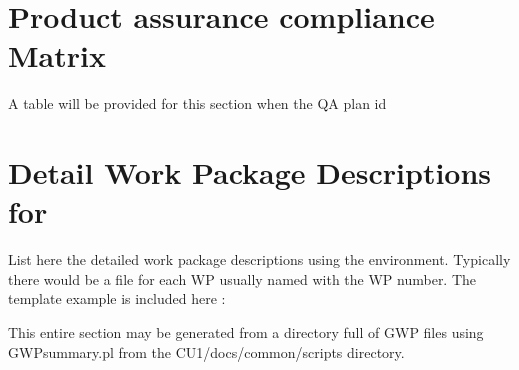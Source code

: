 \documentclass[CUx,lsstdraft,SDP]{lsstdoc}
\begin{document}
\appendix

\section{Product assurance compliance Matrix \label{sect:compmat}}
A table will be provided for this section when the QA plan id

\section {Detail Work Package Descriptions for \CU \label{sect:wpds}}
List here the detailed work package descriptions using the 
environment. Typically there would be a file for each WP usually named
with the WP number. The template example is included here :



This entire section may be generated from a directory full of GWP files
using GWPsummary.pl from the CU1/docs/common/scripts directory.
\end{document}
